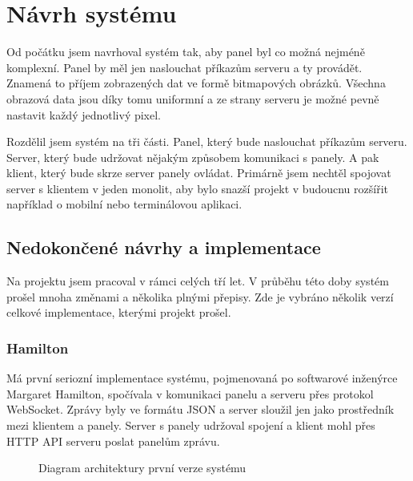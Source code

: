 \chapter{Návrh systému}

Od počátku jsem navrhoval systém tak, aby panel byl co možná nejméně komplexní. Panel by měl jen naslouchat příkazům serveru a ty provádět. Znamená to příjem zobrazených dat ve formě bitmapových obrázků. Všechna obrazová data jsou díky tomu uniformní a ze strany serveru je možné pevně nastavit každý jednotlivý pixel.

Rozdělil jsem systém na tři části. Panel, který bude naslouchat příkazům serveru. Server, který bude udržovat nějakým způsobem komunikaci s panely. A pak klient, který bude skrze server panely ovládat. Primárně jsem nechtěl spojovat server s klientem v jeden monolit, aby bylo snazší projekt v budoucnu rozšířit například o mobilní nebo terminálovou aplikaci.

\section{Nedokončené návrhy a implementace}
Na projektu jsem pracoval v rámci celých tří let. V průběhu této doby systém prošel mnoha změnami a několika plnými přepisy. Zde je vybráno několik verzí celkové implementace, kterými projekt prošel.

\subsection{Hamilton}
Má první seriozní implementace systému, pojmenovaná po softwarové inženýrce Margaret Hamilton, spočívala v komunikaci panelu a serveru přes protokol WebSocket. Zprávy byly ve formátu JSON a server sloužil jen jako prostředník mezi klientem a panely. Server s panely udržoval spojení a klient mohl přes HTTP API serveru poslat panelům zprávu.

\begin{figure}[h]
    \centering
    \caption{Diagram architektury první verze systému}
    \label{fig:first-system-architecture}
\end{figure}

